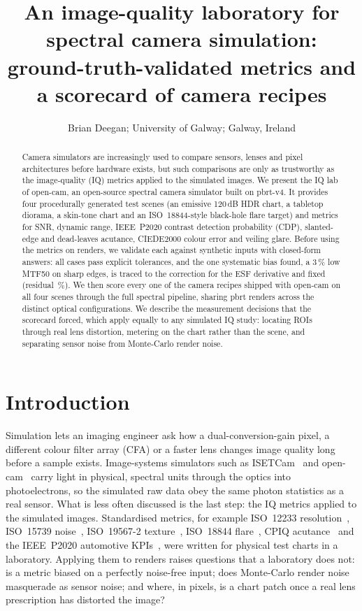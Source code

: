 \documentclass[letterpaper,twocolumn,fleqn]{article}
\title{An image-quality laboratory for spectral camera simulation: ground-truth-validated metrics and a scorecard of \nRecipes{} camera recipes}
\author{Brian Deegan;
        University of Galway;
        Galway, Ireland}
\date{}
\begin{document}
\maketitle
\thispagestyle{empty}

\begin{abstract}
Camera simulators are increasingly used to compare sensors, lenses and pixel architectures before hardware exists, but such comparisons are only as trustworthy as the image-quality (IQ) metrics applied to the simulated images. We present the IQ lab of open-cam, an open-source spectral camera simulator built on pbrt-v4. It provides four procedurally generated test scenes (an emissive 120\,dB HDR chart, a tabletop diorama, a skin-tone chart and an ISO~18844-style black-hole flare target) and metrics for SNR, dynamic range, IEEE~P2020 contrast detection probability (CDP), slanted-edge and dead-leaves acutance, CIEDE2000 colour error and veiling glare. Before using the metrics on renders, we validate each against synthetic inputs with closed-form answers: all \valCases{} cases pass explicit tolerances, and the one systematic bias found, a 3\,\% low MTF50 on sharp edges, is traced to the correction for the ESF derivative and fixed (residual \valSharpBias\,\%). We then score every one of the \nRecipes{} camera recipes shipped with open-cam on all four scenes through the full spectral pipeline, sharing pbrt renders across the \nGroups{} distinct optical configurations. We describe the measurement decisions that the scorecard forced, which apply equally to any simulated IQ study: locating ROIs through real lens distortion, metering on the chart rather than the scene, and separating sensor noise from Monte-Carlo render noise.
\end{abstract}

\section{Introduction}
Simulation lets an imaging engineer ask how a dual-conversion-gain pixel, a different colour filter array (CFA) or a faster lens changes image quality long before a sample exists. Image-systems simulators such as ISETCam~\cite{farrell2012digital,isetcam} and open-cam~\cite{opencam} carry light in physical, spectral units through the optics into photoelectrons, so the simulated raw data obey the same photon statistics as a real sensor. What is less often discussed is the last step: the IQ metrics applied to the simulated images. Standardised metrics, for example ISO~12233 resolution~\cite{iso12233}, ISO~15739 noise~\cite{iso15739}, ISO~19567-2 texture~\cite{iso19567}, ISO~18844 flare~\cite{iso18844}, CPIQ acutance~\cite{baxter2012cpiq} and the IEEE~P2020 automotive KPIs~\cite{p2020whitepaper,geese2018cdp}, were written for physical test charts in a laboratory. Applying them to renders raises questions that a laboratory does not: is a metric biased on a perfectly noise-free input; does Monte-Carlo render noise masquerade as sensor noise; and where, in pixels, is a chart patch once a real lens prescription has distorted the image?
\end{document}
